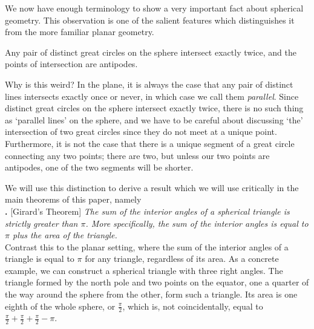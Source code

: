 We now have enough terminology to show a very important fact about spherical geometry.  This  observation is one of the salient features which distinguishes it from the more familiar planar geometry.


\begin{claim}
	Any pair of distinct great circles on the sphere intersect exactly twice, and the points of intersection are antipodes.
\end{claim}



Why is this weird? In the plane, it is always the case that any pair of distinct lines intersects exactly once or never, in which case we call them \textit{parallel}. Since distinct great circles on the sphere intersect exactly twice, there is no such thing as `parallel lines' on the sphere, and we have to be careful about discussing `the' intersection of two great circles since they do not meet at a unique point.  Furthermore, it is not the case that there is a unique segment of a great circle connecting any two points; there are two, but unless our two points are antipodes, one of the two segments will be shorter. 



We will use this distinction to derive a result which we will use critically in the main theorems of this paper, namely\\

\noindent\textbf{.} [Girard's Theorem]
\emph{The sum of the interior angles of a spherical triangle is strictly greater than $\pi$.  More specifically, the sum of the interior angles is equal to $\pi$ plus the area of the triangle.}\\

Contrast this to the planar setting, where the sum of the interior angles of a triangle is equal to $\pi$ for any triangle, regardless of its area.  As a concrete example, we can construct a spherical triangle with three right angles.  The triangle formed by the north pole and two points on the equator, one a quarter of the way around the sphere from the other, form such a triangle.  Its area is one eighth of the whole sphere, or $\tfrac{\pi}{2}$, which is, not coincidentally, equal to $\tfrac{\pi}{2}+\tfrac{\pi}{2}+\tfrac{\pi}{2} - \pi$.


